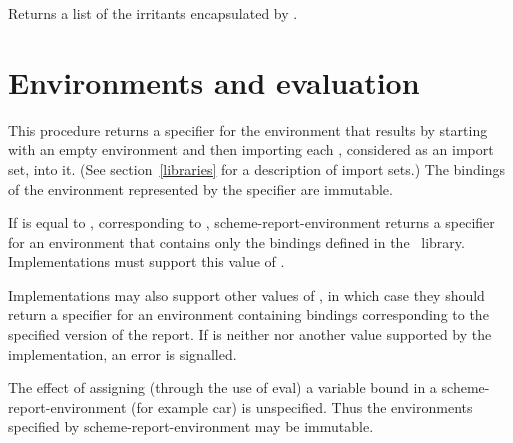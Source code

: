 \begin{entry}{%
}

Returns a list of the irritants encapsulated by .

\end{entry}

\section{Environments and evaluation}

\begin{entry}{%
}
\label{environments}

This procedure returns a specifier for the environment that results by
starting with an empty environment and then importing each ,
considered as an import set, into it.  (See section~\ref{libraries} for
a description of import sets.)  The bindings of the environment
represented by the specifier are immutable.

\end{entry}

\begin{entry}{%
}

If  is equal to {},
corresponding to \rfivers,
{\cf scheme-report-environment} returns a specifier for an
environment that contains only the bindings
defined in the \rfivers\ library.
Implementations must support this value of .

Implementations may also support other values of , in which
case they should return a specifier for an environment containing bindings corresponding to the specified version of the report.
If 
is neither {} nor another value supported by
the implementation, an error is signalled.

The effect of assigning (through the use of {\cf eval}) a variable
bound in a {\cf scheme-report-environment}
(for example {\cf car}) is unspecified.  Thus the environments specified
by {\cf scheme-report-environment} may be immutable.

\end{entry}

